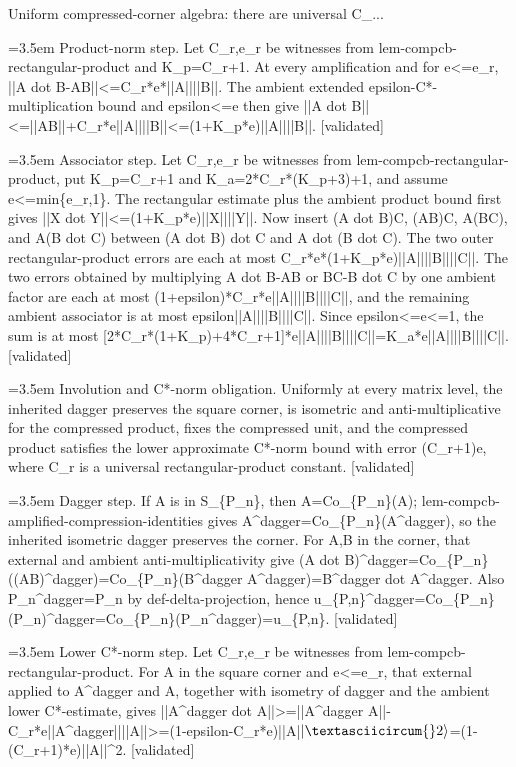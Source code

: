 \documentclass{article}
\newcommand{\step}[1]{\par\noindent\hangindent=3.5em\hangafter=1%
  \makebox[3.5em][l]{\textbf{#1.}}}
\newcommand{\steptag}[1]{\hfill{\small\textsf{[#1]}}}
\begin{document}
\begin{proofbox}{Uniform compressed-corner algebra: there are universal C\_...}
\step{1.3.1} Product-norm step. Let C\_r,e\_r be witnesses from lem-compcb-rectangular-product and K\_p=C\_r+1. At every amplification and for e<=e\_r, ||A dot B-AB||<=C\_r*e*||A||||B||. The ambient extended epsilon-C*-multiplication bound and epsilon<=e then give ||A dot B||<=||AB||+C\_r*e||A||||B||<=(1+K\_p*e)||A||||B||. \steptag{validated} \\[4pt]
\step{1.3.2} Associator step. Let C\_r,e\_r be witnesses from lem-compcb-rectangular-product, put K\_p=C\_r+1 and K\_a=2*C\_r*(K\_p+3)+1, and assume e<=min\{e\_r,1\}. The rectangular estimate plus the ambient product bound first gives ||X dot Y||<=(1+K\_p*e)||X||||Y||. Now insert (A dot B)C, (AB)C, A(BC), and A(B dot C) between (A dot B) dot C and A dot (B dot C). The two outer rectangular-product errors are each at most C\_r*e*(1+K\_p*e)||A||||B||||C||. The two errors obtained by multiplying A dot B-AB or BC-B dot C by one ambient factor are each at most (1+epsilon)*C\_r*e||A||||B||||C||, and the remaining ambient associator is at most epsilon||A||||B||||C||. Since epsilon<=e<=1, the sum is at most [2*C\_r*(1+K\_p)+4*C\_r+1]*e||A||||B||||C||=K\_a*e||A||||B||||C||. \steptag{validated} \\[4pt]
\step{1.4} Involution and C*-norm obligation. Uniformly at every matrix level, the inherited dagger preserves the square corner, is isometric and anti-multiplicative for the compressed product, fixes the compressed unit, and the compressed product satisfies the lower approximate C*-norm bound with error (C\_r+1)e, where C\_r is a universal rectangular-product constant. \steptag{validated} \\[6pt]
\step{1.4.1} Dagger step. If A is in S\_\{P\_n\}, then A=Co\_\{P\_n\}(A); lem-compcb-amplified-compression-identities gives A\textasciicircum{}dagger=Co\_\{P\_n\}(A\textasciicircum{}dagger), so the inherited isometric dagger preserves the corner. For A,B in the corner, that external and ambient anti-multiplicativity give (A dot B)\textasciicircum{}dagger=Co\_\{P\_n\}((AB)\textasciicircum{}dagger)=Co\_\{P\_n\}(B\textasciicircum{}dagger A\textasciicircum{}dagger)=B\textasciicircum{}dagger dot A\textasciicircum{}dagger. Also P\_n\textasciicircum{}dagger=P\_n by def-delta-projection, hence u\_\{P,n\}\textasciicircum{}dagger=Co\_\{P\_n\}(P\_n)\textasciicircum{}dagger=Co\_\{P\_n\}(P\_n\textasciicircum{}dagger)=u\_\{P,n\}. \steptag{validated} \\[4pt]
\step{1.4.2} Lower C*-norm step. Let C\_r,e\_r be witnesses from lem-compcb-rectangular-product. For A in the square corner and e<=e\_r, that external applied to A\textasciicircum{}dagger and A, together with isometry of dagger and the ambient lower C*-estimate, gives ||A\textasciicircum{}dagger dot A||>=||A\textasciicircum{}dagger A||-C\_r*e||A\textasciicircum{}dagger||||A||>=(1-epsilon-C\_r*e)||A|$|\textasciicircum{}2\rangle$=(1-(C\_r+1)*e)||A||\textasciicircum{}2. \steptag{validated} \\[4pt]

\end{proofbox}
\end{document}
